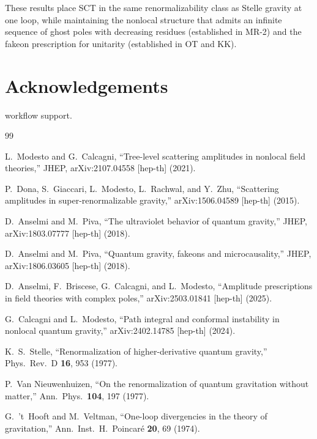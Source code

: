 \documentclass[11pt,a4paper]{article}
\theoremstyle{definition}
\theoremstyle{remark}
\begin{document}
These results place SCT in the same renormalizability class as Stelle
gravity at one loop, while maintaining the nonlocal structure that admits
an infinite sequence of ghost poles with decreasing residues (established
in MR-2) and the fakeon prescription for unitarity (established in
OT and KK).

\section*{Acknowledgements}

workflow support.

\begin{thebibliography}{99}

  L.~Modesto and G.~Calcagni,
  ``Tree-level scattering amplitudes in nonlocal field theories,''
  JHEP, arXiv:2107.04558 [hep-th] (2021).

  P.~Dona, S.~Giaccari, L.~Modesto, L.~Rachwal, and Y.~Zhu,
  ``Scattering amplitudes in super-renormalizable gravity,''
  arXiv:1506.04589 [hep-th] (2015).

  D.~Anselmi and M.~Piva,
  ``The ultraviolet behavior of quantum gravity,''
  JHEP, arXiv:1803.07777 [hep-th] (2018).

  D.~Anselmi and M.~Piva,
  ``Quantum gravity, fakeons and microcausality,''
  JHEP, arXiv:1806.03605 [hep-th] (2018).

  D.~Anselmi, F.~Briscese, G.~Calcagni, and L.~Modesto,
  ``Amplitude prescriptions in field theories with complex poles,''
  arXiv:2503.01841 [hep-th] (2025).

  G.~Calcagni and L.~Modesto,
  ``Path integral and conformal instability in nonlocal quantum gravity,''
  arXiv:2402.14785 [hep-th] (2024).

  K.~S.~Stelle,
  ``Renormalization of higher-derivative quantum gravity,''
  Phys.\ Rev.\ D \textbf{16}, 953 (1977).

  P.~Van Nieuwenhuizen,
  ``On the renormalization of quantum gravitation without matter,''
  Ann.\ Phys.\ \textbf{104}, 197 (1977).

  G.~'t~Hooft and M.~Veltman,
  ``One-loop divergencies in the theory of gravitation,''
  Ann.\ Inst.\ H.\ Poincar\'e \textbf{20}, 69 (1974).

\end{thebibliography}
\end{document}
